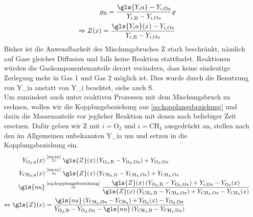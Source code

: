 \begin{align}
    \varrho_{\text{B}}  = \frac{ \gls{Y_ia} - Y_{i,\text{Ox}} }{ Y_{i,\text{B}}-Y_{i,\text{Ox}} } \varrho \\
    \label{eq:zy}
    \Rightarrow
    Z(x) = \frac{ \gls{Y_ia}(x) - Y_{i,\text{Ox}} }{ Y_{i,\text{B}}-Y_{i,\text{Ox}} }
\end{align}
Bisher ist die Anwendbarkeit des Mischungsbruches \gls{Z} stark beschränkt, nämlich auf Gase gleicher Diffusion und falls keine Reaktion stattfindet. Reaktionen würden die Gaskomponentenanteile derart verändern, dass keine eindeutige Zerlegung mehr in Gas 1 und Gas 2 möglich ist. Dies wurde durch die Benutzung von \gls{Y_ia} anstatt von \gls{Y_i} beachtet, siehe auch S.\pageref{pg:anfangsgemisch}\\

Um zumindest auch unter reaktiven Prozessen mit dem Mischungsbruch zu rechnen, wollen wir die Kopplungsbeziehung aus \autoref{eq:kopplungsbeziehung} und darin die Massenanteile vor jeglicher Reaktion mit denen nach beliebiger Zeit ersetzen. Dafür geben wir \gls{Z} mit $i=\mathrm{O}_2$ und $i=\mathrm{CH}_4$ ausgedrückt an, stellen nach den im Allgemeinen unbekannten \gls{Y_ia} um und setzen in die Kopplungsbeziehung ein.
\begin{align}
    Y_{\mathrm{O}_2,\text{a}}(x)
        & \overset{\text{\autoref{eq:zy}}}{=}
        \gls{Z}(x) \left( Y_{\mathrm{O}_2,\text{B}} -
                          Y_{\mathrm{O}_2,\text{Ox}} \right)
        + Y_{\mathrm{O}_2,\text{Ox}}
    \\
    Y_{\mathrm{CH}_4,\text{a}}(x)
        & \overset{\text{\autoref{eq:zy}}}{=}
        \gls{Z}(x) \left( Y_{\mathrm{CH}_4,\text{B}} -
                          Y_{\mathrm{CH}_4,\text{Ox}} \right)
        + Y_{\mathrm{CH}_4,\text{Ox}}
    \\
    \gls{nu}
        & \overset{\text{\autoref{eq:kopplungsbeziehung}}}{=}
        \frac{ \gls{Z}(x) \left( Y_{\mathrm{O}_2,\text{B}} -
                                 Y_{\mathrm{O}_2,\text{Ox}} \right)
            + Y_{i,\text{Ox}} - Y_{\mathrm{O}_2}(x) }
        { \gls{Z}(x) \left( Y_{\mathrm{CH}_4,\text{B}} -
                            Y_{\mathrm{CH}_4,\text{Ox}} \right)
            + Y_{\mathrm{CH}_4,\text{Ox}} - Y_{\mathrm{CH}_4}(x) }
    \\ \Leftrightarrow
    \gls{Z}(x) & =
        \frac{ \gls{nu}\left( Y_{\mathrm{CH}_4,\text{Ox}} -
                              Y_{\mathrm{CH}_4} \right)
            + Y_{\mathrm{O}_2}(x) - Y_{\mathrm{O}_2,\text{Ox}}
        }{
            Y_{\mathrm{O}_2,\text{B}} - Y_{\mathrm{O}_2,\text{Ox}}
            - \gls{nu}\left( Y_{\mathrm{CH}_4,\text{B}} -
                             Y_{\mathrm{CH}_4,\text{Ox}} \right)
        }
\end{align}
